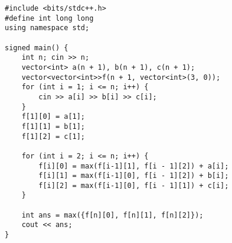 \begin{lstlisting}[title=\centering \textbf{Cài đặt}]
#include <bits/stdc++.h>
#define int long long
using namespace std;

signed main() {
    int n; cin >> n;
    vector<int> a(n + 1), b(n + 1), c(n + 1);
    vector<vector<int>>f(n + 1, vector<int>(3, 0));
    for (int i = 1; i <= n; i++) {
        cin >> a[i] >> b[i] >> c[i];
    }
    f[1][0] = a[1];
    f[1][1] = b[1];
    f[1][2] = c[1];

    for (int i = 2; i <= n; i++) {
        f[i][0] = max(f[i-1][1], f[i - 1][2]) + a[i];
        f[i][1] = max(f[i-1][0], f[i - 1][2]) + b[i];
        f[i][2] = max(f[i-1][0], f[i - 1][1]) + c[i];
    }

    int ans = max({f[n][0], f[n][1], f[n][2]});
    cout << ans;
}
\end{lstlisting}
